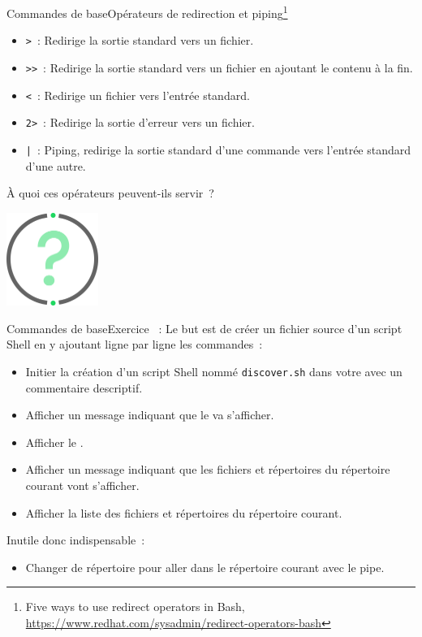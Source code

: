 \documentclass{beamer}
\begin{document}
    \begin{frame}{Commandes de base}{Opérateurs de redirection et piping\footnote{Five ways to use redirect operators in Bash, \url{https://www.redhat.com/sysadmin/redirect-operators-bash}}}
        \begin{itemize}
            \item \lstinline{>}~: Redirige la sortie standard vers un fichier.
            \item \lstinline{>>}~: Redirige la sortie standard vers un fichier en ajoutant le contenu à la fin.
            \item \lstinline{<}~: Redirige un fichier vers l'entrée standard.
            \item \lstinline{2>}~: Redirige la sortie d'erreur vers un fichier.
            \item \lstinline{|}~: Piping, redirige la sortie standard d'une commande vers l'entrée standard d'une autre.
        \end{itemize}
        À quoi ces opérateurs peuvent-ils servir~?
        \begin{center}
            \includegraphics[width=3cm]{image/question-mark}
        \end{center}
    \end{frame}

    \begin{frame}{Commandes de base}{Exercice \execcounterdispinc{}~:}
        Le but est de créer un fichier source d'un script Shell en y ajoutant ligne par ligne les commandes~:
        \begin{itemize}
            \item Initier la création d'un script Shell nommé \lstinline{discover.sh} dans votre  avec un commentaire descriptif.
            \item Afficher un message indiquant que le  va s'afficher.
            \item Afficher le .
            \item Afficher un message indiquant que les fichiers et répertoires du répertoire courant vont s'afficher.
            \item Afficher la liste des fichiers et répertoires du répertoire courant.
        \end{itemize}

        Inutile donc indispensable~:
        \begin{itemize}
            \item Changer de répertoire pour aller dans le répertoire courant avec le pipe.
        \end{itemize}
    \end{frame}
\end{document}
